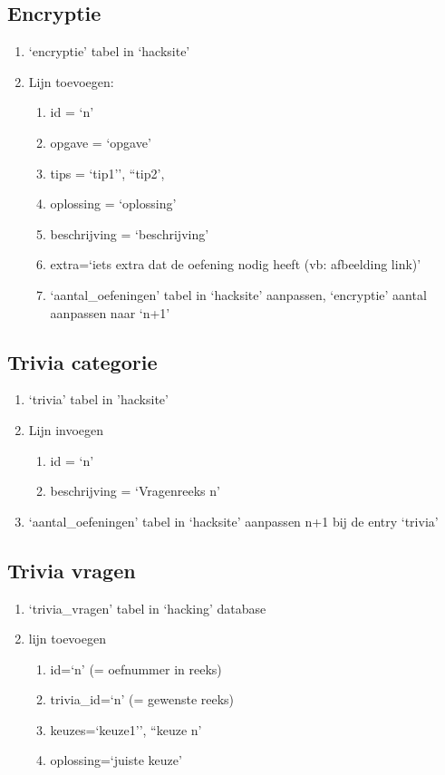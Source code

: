 \subsection{Encryptie} 
\begin{enumerate}
\item `encryptie' tabel in `hacksite'
\item Lijn toevoegen:
	\begin{enumerate}
	\item id = `n'
	\item opgave = `opgave'
	\item tips = `tip1'', ``tip2',
	\item oplossing = `oplossing'
	\item beschrijving = `beschrijving'
	\item extra=`iets extra dat de oefening nodig heeft (vb: afbeelding link)'
	\item `aantal\_oefeningen' tabel in `hacksite' aanpassen, `encryptie' aantal aanpassen naar `n+1'
	\end{enumerate}
\end{enumerate}

\subsection{Trivia categorie} 
\begin{enumerate}
\item `trivia' tabel in 'hacksite'
\item Lijn invoegen
	\begin{enumerate}
	\item id = `n'
	\item beschrijving = `Vragenreeks n'
	\end{enumerate}
\item `aantal\_oefeningen' tabel in `hacksite' aanpassen n+1 bij de entry `trivia'
\end{enumerate}

\subsection{Trivia vragen} 
\begin{enumerate}
\item `trivia\_vragen' tabel in `hacking' database
\item lijn toevoegen
	\begin{enumerate}
	\item id=`n' (= oefnummer in reeks)
	\item trivia\_id=`n' (= gewenste reeks)
	\item keuzes=`keuze1'', ``keuze n'
	\item oplossing=`juiste keuze'
	\end{enumerate}
\end{enumerate}


